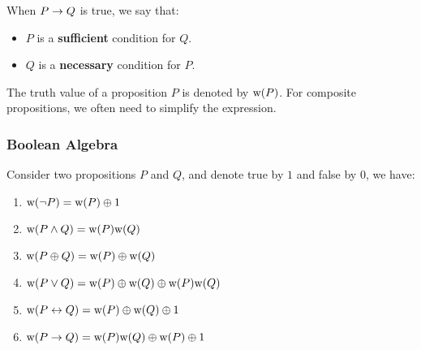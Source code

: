 \begin{definition}
    When $P \rightarrow Q$ is true, we say that:
    \begin{itemize}
        \item $P$ is a \textbf{sufficient} condition for $Q$.
        \item $Q$ is a \textbf{necessary} condition for $P$.
    \end{itemize}
\end{definition}

The truth value of a proposition $P$ is denoted by $\text{w(}P\text{)}$. For composite propositions,
we often need to simplify the expression.

\subsubsection{Boolean Algebra}

\begin{definition}
    Consider two propositions $P$ and $Q$, and denote true by $1$ and false by $0$, we have:
    \begin{multicols}{2}
        \begin{enumerate}
            \item $\text{w(}\neg P\text{)} = \text{w(}P\text{)} \oplus 1$
            \item $\text{w(}P \wedge Q\text{)} = \text{w(}P\text{)}\text{w(}Q\text{)}$
            \item $\text{w(}P \oplus Q\text{)} = \text{w(}P\text{)} \oplus \text{w(}Q\text{)}$
            \item $\text{w(}P \vee Q\text{)} = \text{w(}P\text{)} \oplus \text{w(}Q\text{)} \oplus \text{w(}P\text{)}\text{w(}Q\text{)}$
            \item $\text{w(}P \leftrightarrow Q\text{)} = \text{w(}P\text{)} \oplus \text{w(}Q\text{)} \oplus 1$
            \item $\text{w(}P \rightarrow Q\text{)} = \text{w(}P\text{)}\text{w(}Q\text{)} \oplus \text{w(}P\text{)} \oplus 1$
        \end{enumerate}
    \end{multicols}
\end{definition}

